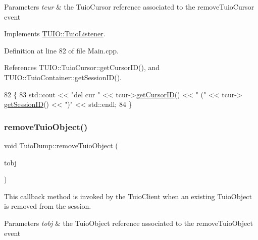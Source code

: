 \begin{DoxyParams}{Parameters}
{\em tcur} & the Tuio\+Cursor reference associated to the remove\+Tuio\+Cursor event \\
\hline
\end{DoxyParams}


Implements \hyperlink{class_t_u_i_o_1_1_tuio_listener_ade7712d189c28c82c447a815022254d9}{T\+U\+I\+O\+::\+Tuio\+Listener}.



Definition at line 82 of file Main.\+cpp.



References T\+U\+I\+O\+::\+Tuio\+Cursor\+::get\+Cursor\+I\+D(), and T\+U\+I\+O\+::\+Tuio\+Container\+::get\+Session\+I\+D().


\begin{DoxyCode}
82                                                 \{
83     std::cout << \textcolor{stringliteral}{"del cur "} << tcur->\hyperlink{class_t_u_i_o_1_1_tuio_cursor_a3e8ee1381e61eb54c7563e10a2fafb0b}{getCursorID}() << \textcolor{stringliteral}{" ("} <<  tcur->
      \hyperlink{class_t_u_i_o_1_1_tuio_container_a84c29bb63b233dbfd22811dab5b62833}{getSessionID}() << \textcolor{stringliteral}{")"} << std::endl;
84 \}
\end{DoxyCode}
\mbox{\label{class_tuio_dump_a5ed9e2ea7858b885bf52558c1c6e7e69}} 
\subsubsection{\texorpdfstring{remove\+Tuio\+Object()}{removeTuioObject()}}
{\footnotesize\ttfamily void Tuio\+Dump\+::remove\+Tuio\+Object (\begin{DoxyParamCaption}\item[{\hyperlink{class_t_u_i_o_1_1_tuio_object}{Tuio\+Object} $\ast$}]{tobj }\end{DoxyParamCaption})\hspace{0.3cm}{\ttfamily [virtual]}}

This callback method is invoked by the Tuio\+Client when an existing Tuio\+Object is removed from the session.


\begin{DoxyParams}{Parameters}
{\em tobj} & the Tuio\+Object reference associated to the remove\+Tuio\+Object event \\
\hline
\end{DoxyParams}


